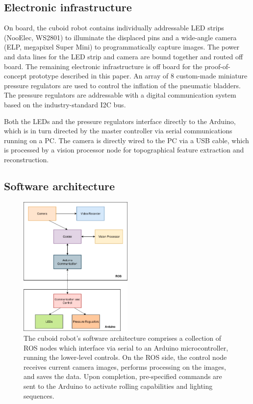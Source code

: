 \documentclass[letterpaper, 12 pt, conference]{ieeeconf}  %
\begin{document}
\subsection{Electronic infrastructure}

On board, the cuboid robot contains individually addressable LED strips (NooElec, WS2801) to illuminate the displaced pins and a wide-angle camera (ELP, megapixel Super Mini) to programmatically capture images. The power and data lines for the LED strip and camera are bound together and routed off board. The remaining electronic infrastructure is off board for the proof-of-concept prototype described in this paper. An array of 8 custom-made miniature pressure regulators \cite{p_regu} are used to control the inflation of the pneumatic bladders. The pressure regulators are addressable with a digital communication system based on the industry-standard I2C bus. 

Both the LEDs and the pressure regulators interface directly to the Arduino, which is in turn directed by the master controller via serial communications running on a PC. The camera is directly wired to the PC via a USB cable, which is processed by a vision processor node for topographical feature extraction and reconstruction.  

\subsection{Software architecture}

\begin{figure}
\centering
\includegraphics[width=0.5\textwidth]{Figures/Fig4.png}
\caption{The cuboid robot's software architecture comprises a collection of ROS nodes which interface via serial to an Arduino microcontroller, running the lower-level controls. On the ROS side, the control node receives current camera images, performs processing on the images, and saves the data. Upon completion, pre-specified commands are sent to the Arduino to activate rolling capabilities and lighting sequences. }
\label{fig:architecture_soft} 
\end{figure}
\end{document}
